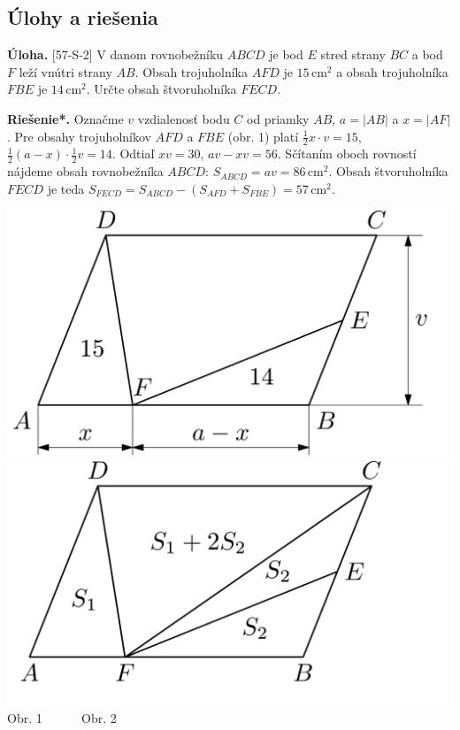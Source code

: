 \documentclass[11pt,a4paper,oneside,final]{book}
\newcommand{\ul}{\textbf{Úloha.} }
\newcommand{\rieh}{\textbf{Riešenie*.} }
\begin{document}
\subsection*{Úlohy a riešenia}
\begin{tcolorbox}[breakable,notitle,boxrule=0pt,colback=light-gray,colframe=light-gray]\ul [57-S-2] V danom rovnobežníku $ABCD$ je bod $E$ stred strany $BC$ a bod $F$ leží vnútri strany $AB$. Obsah trojuholníka $AFD$ je $15$\,cm$^2$ a obsah trojuholníka $FBE$ je $14$\,cm$^2$. Určte obsah štvoruholníka $FECD$.

\end{tcolorbox}

\rieh Označme $v$ vzdialenosť bodu $C$ od priamky $AB$, $a = |AB|$ a $x = |AF|$. Pre obsahy trojuholníkov $AFD$ a $FBE$ (obr. 1) platí $\frac{1}{2}x\cdot v = 15$, $\frac{1}{2}(a - x) \cdot \frac{1}{2}v = 14$. Odtiaľ $xv = 30$, $av - xv = 56$. Sčítaním oboch rovností nájdeme obsah rovnobežníka $ABCD$: $S_{ABCD} = av = 86$\,cm$^2$. Obsah štvoruholníka $FECD$ je teda $S_{FECD} = S_{ABCD}- (S_{AFD} + S_ {FBE}) = 57$\,cm$^2.$
\begin{center}
\includegraphics{57S21} \includegraphics{57S22}\\

Obr. 1  \ \ \ \ \ \hspace{130pt} Obr. 2
\end{center}
\end{document}
